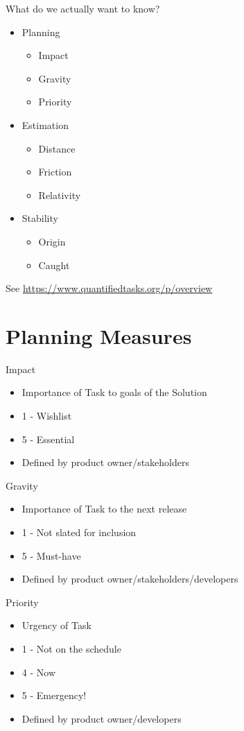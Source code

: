 \documentclass[aspectratio=169]{beamer}
\begin{document}
\begin{frame}{What do we actually want to know?}
    \begin{itemize}
        \item Planning
        \begin{itemize}
            \item Impact
            \item Gravity
            \item Priority
        \end{itemize}
        \item Estimation
        \begin{itemize}
            \item Distance
            \item Friction
            \item Relativity
        \end{itemize}
        \item Stability
        \begin{itemize}
            \item Origin
            \item Caught
        \end{itemize}
    \end{itemize}
    See \url{https://www.quantifiedtasks.org/p/overview}
\end{frame}
\section{Planning Measures}
\begin{frame}{Impact}
    \begin{itemize}
        \item Importance of Task to goals of the Solution
        \item 1 - Wishlist
        \item 5 - Essential
        \item Defined by product owner/stakeholders
    \end{itemize}
\end{frame}
\begin{frame}{Gravity}
    \begin{itemize}
        \item Importance of Task to the next release
        \item 1 - Not slated for inclusion
        \item 5 - Must-have
        \item Defined by product owner/stakeholders/developers
    \end{itemize}
\end{frame}
\begin{frame}{Priority}
    \begin{itemize}
        \item Urgency of Task
        \item 1 - Not on the schedule
        \item 4 - Now
        \item 5 - Emergency!
        \item Defined by product owner/developers
    \end{itemize}
\end{frame}
\end{document}
